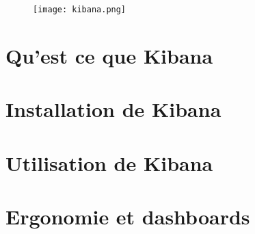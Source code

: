 \begin{figure}[H]
\center
\texttt{[image: kibana.png]}
\label{fig:kibana.png}
\end{figure}
\section{Qu'est ce que Kibana}



\section{Installation de Kibana}



\section{Utilisation de Kibana}


\section{Ergonomie et dashboards}
